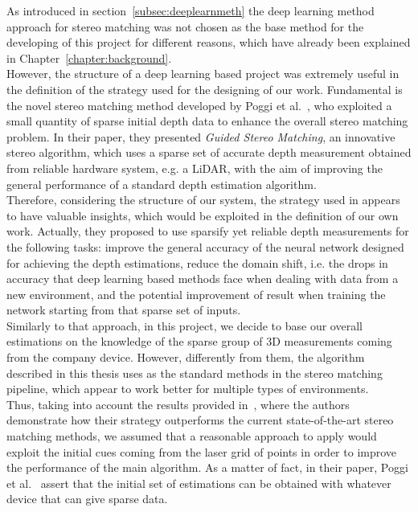 As introduced in section~\ref{subsec:deeplearnmeth} the deep learning method approach for stereo matching was not chosen as the base method for the developing of this project for different reasons, which have already been explained in Chapter~\ref{chapter:background}.\\
However, the structure of a deep learning based project was extremely useful in the definition of the strategy used for the designing of our work.
Fundamental is the novel stereo matching method developed by Poggi et al.~\cite{Poggi2019}, who exploited a small quantity of sparse initial depth data to enhance the overall stereo matching problem.
In their paper, they presented \textit{Guided Stereo Matching}, an innovative stereo algorithm, which uses a sparse set of accurate depth measurement obtained from reliable hardware system, e.g. a LiDAR, with the aim of improving the general performance of a standard depth estimation algorithm.\\
Therefore, considering the structure of our system, the strategy used in \cite{Poggi2019} appears to have valuable insights, which would be exploited in the definition of our own work.
Actually, they proposed to use sparsify yet reliable depth measurements for the following tasks: improve the general accuracy of the neural network designed for achieving the depth estimations, reduce the domain shift, i.e. the drops in accuracy that deep learning based methods face when dealing with data from a new environment, and the potential improvement of result when training the network starting from that sparse set of inputs.\\
Similarly to that approach, in this project, we decide to base our overall estimations on the knowledge of the sparse group of 3D measurements coming from the company device.
However, differently from them, the algorithm described in this thesis uses as the standard methods in the  stereo matching pipeline, which appear to work better for multiple types of environments. \\
Thus, taking into account the results provided in~\cite{Poggi2019}, where the authors demonstrate how their strategy outperforms the current state-of-the-art stereo matching methods, we assumed that a reasonable approach to apply would exploit the initial cues coming from the laser grid of points in order to improve the performance of the main algorithm. 
As a matter of fact, in their paper, Poggi et al.~\cite{Poggi2019} assert that the initial set of estimations can be obtained with whatever device that can give sparse data.\\

